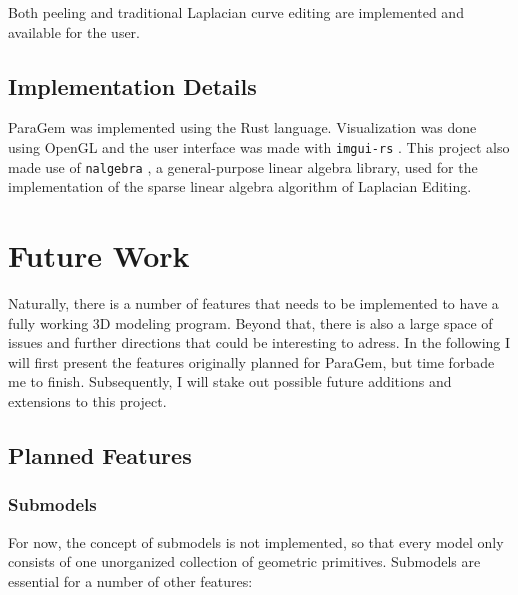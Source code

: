 \documentclass[english]{article}
\begin{document}
Both peeling and traditional Laplacian curve editing are implemented and available for the user.

\pagebreak

\subsection{Implementation Details}


ParaGem was implemented using the Rust language. Visualization was done using OpenGL and the user interface was made with \texttt{imgui-rs} \cite{imguirs}. This project also made use of \texttt{nalgebra} \cite{nalgebra}, a general-purpose linear algebra library, used for the implementation of the sparse linear algebra algorithm of Laplacian Editing.


\pagebreak

\section{Future Work} \label{section_future_work}


Naturally, there is a number of features that needs to be implemented to have a fully working 3D modeling program. Beyond that, there is also a large space of issues and further directions that could be interesting to adress. In the following I will first present the features originally planned for ParaGem, but time forbade me to finish. Subsequently, I will stake out possible future additions and extensions to this project.

\subsection{Planned Features}

\subsubsection{Submodels}


For now, the concept of submodels is not implemented, so that every model only consists of one unorganized collection of geometric primitives. Submodels are essential for a number of other features:
\end{document}
